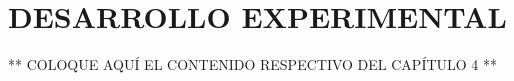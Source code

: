 \chapter{DESARROLLO EXPERIMENTAL}
\thispagestyle{empty}

** COLOQUE AQUÍ EL CONTENIDO RESPECTIVO DEL CAPÍTULO 4 **